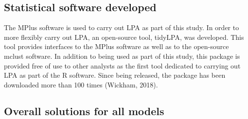 \documentclass[]{book}
\theoremstyle{definition}
\theoremstyle{definition}
\theoremstyle{definition}
\theoremstyle{remark}
\begin{document}
\subsection{Statistical software
developed}\label{statistical-software-developed}

The MPlus software is used to carry out LPA as part of this study. In
order to more flexibly carry out LPA, an open-source tool, tidyLPA, was
developed. This tool provides interfaces to the MPlus software as well
as to the open-source mclust software. In addition to being used as part
of this study, this package is provided free of use to other analysts as
the first tool dedicated to carrying out LPA as part of the R software.
Since being released, the package has been downloaded more than 100
times (Wickham, 2018).

\subsection{Overall solutions for all
models}\label{overall-solutions-for-all-models}
\end{document}
